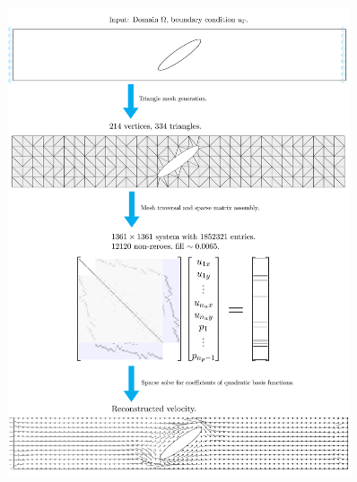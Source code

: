 \begin{figure}[H]
   \centering
    \centerline{\includegraphics[width=0.9\textwidth]{figures/stokes/pipe/full.png}}
    \label{stokes_pipe}
\end{figure}




% 
% 
% 
